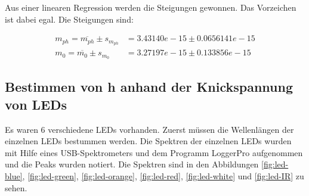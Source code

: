 Aus einer  linearen  Regression werden die Steigungen gewonnen. Das Vorzeichen
ist dabei egal. Die Steigungen sind:

\begin{align*}
    m_{ph} = \overline{m_{ph}} \pm s_{m_{ph}} &= 3.43140e-15 \pm 0.0656141e-15 \\
    m_0    = \overline{m_0} \pm s_{m_0}       &= 3.27197e-15 \pm 0.133856e-15
\end{align*}

\clearpage
\subsection{Bestimmen von h anhand der Knickspannung von LEDs}

Es waren 6 verschiedene LEDs vorhanden. Zuerst m\"ussen die Wellenl\"angen der
einzelnen LEDs bestummen werden. Die  Spektren  der  einzelnen LEDs wurden mit
Hilfe eines USB-Spektrometers und dem Programm  LoggerPro  aufgenommen und die
Peaks wurden notiert. Die Spektren sind in den Abbildungen \ref{fig:led-blue},
\ref{fig:led-green},          \ref{fig:led-orange},         \ref{fig:led-red},
\ref{fig:led-white} und \ref{fig:led-IR} zu sehen.

